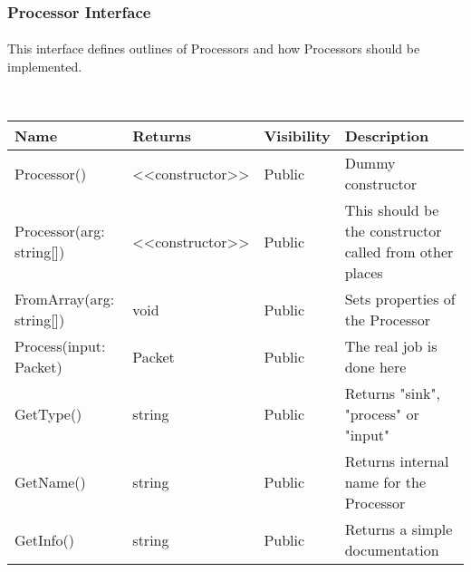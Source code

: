 \skipsubsection

\subsubsection{Processor Interface}
\paragraph{}
\normalsize
This interface defines outlines of Processors and how Processors should be implemented. \\

\begin{center}
	\\[0.8cm]
	\begin{tabular}{|p{4cm}|p{2.2cm}|p{1.8cm}|p{6cm}|}
		\hline 
			Name & Returns & Visibility & Description \\
		\hline 
			Processor() & <<constructor>> & Public & Dummy constructor \\
		\hline 
			Processor(arg: string[]) & <<constructor>> & Public & This should be the constructor called from other places \\
		\hline
			FromArray(arg: string[]) & void & Public & Sets properties of the Processor \\
		\hline
			Process(input: Packet) & Packet & Public & The real job is done here \\
		\hline
			GetType() & string & Public & Returns "sink", "process" or "input" \\
		\hline
			GetName() & string & Public & Returns internal name for the Processor \\
		\hline
			GetInfo() & string & Public & Returns a simple documentation\\
		\hline
	\end{tabular}
\end{center}


